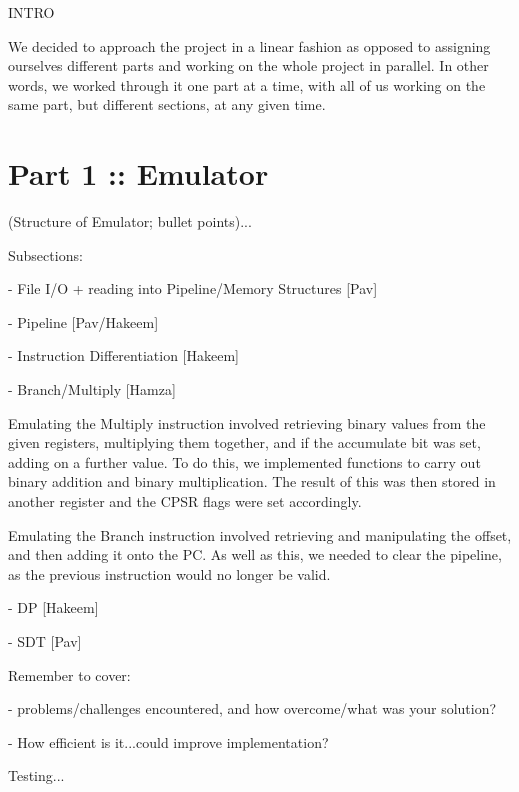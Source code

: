 INTRO

We decided to approach the project in a linear fashion as opposed to assigning ourselves different parts and working on the whole project in parallel. In other words, we worked through it one part at a time, with all of us working on the same part, but different sections, at any given time.  








\section{Part 1 :: Emulator}

 

(Structure of Emulator; bullet points)...

 

Subsections:

- File I/O + reading into Pipeline/Memory Structures [Pav]

- Pipeline [Pav/Hakeem]

- Instruction Differentiation [Hakeem]

 

-       Branch/Multiply [Hamza]

Emulating the Multiply instruction involved retrieving binary values from the given registers, multiplying them together, and if the accumulate bit was set, adding on a further value. To do this, we implemented functions to carry out binary addition and binary multiplication.  The result of this was then stored in another register and the CPSR flags were set accordingly.

Emulating the Branch instruction involved retrieving and manipulating the offset, and then adding it onto the PC.  As well as this, we needed to clear the pipeline, as the previous instruction would no longer be valid.

 

- DP [Hakeem]

- SDT [Pav]

 

Remember to cover:

- problems/challenges encountered, and how overcome/what was your solution?

- How efficient is it...could improve implementation?

 

Testing...

 


